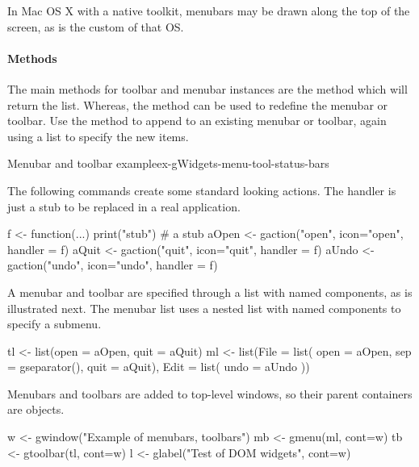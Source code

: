 In Mac OS X with a native toolkit, menubars may be drawn along the top
of the screen, as is the custom of that OS. 

\paragraph{Methods}
The main methods for toolbar and menubar instances are
the  method which will return the list. Whereas, the
 method can be used to redefine the
menubar or toolbar. Use the  method to append to an
existing menubar or toolbar, again using a list to specify the new items.


\begin{example}{Menubar and toolbar example}{ex-gWidgets-menu-tool-status-bars}

The following commands create some standard looking actions. The
handler  is just a stub to be replaced in a real application.
\begin{Schunk}
\begin{Sinput}
 f <- function(...) print("stub")        # a stub
 aOpen <- gaction("open", icon="open", handler = f)
 aQuit <- gaction("quit", icon="quit", handler = f)
 aUndo <- gaction("undo", icon="undo", handler = f)
\end{Sinput}
\end{Schunk}

A menubar and toolbar are specified through a list with named components, as is
illustrated next. The menubar list uses a nested list with
named components to specify a submenu.
\begin{Schunk}
\begin{Sinput}
 tl <- list(open = aOpen, quit = aQuit)
 ml <- list(File = list(
              open = aOpen, 
              sep = gseparator(), 
              quit = aQuit),
            Edit = list(
              undo = aUndo
              ))
\end{Sinput}
\end{Schunk}


Menubars and toolbars are added to top-level windows, so their parent
containers are  objects.
\begin{Schunk}
\begin{Sinput}
 w <- gwindow("Example of menubars, toolbars")
 mb <- gmenu(ml, cont=w)
 tb <- gtoolbar(tl, cont=w)
 l <- glabel("Test of DOM widgets", cont=w)
\end{Sinput}
\end{Schunk}



\end{example}
